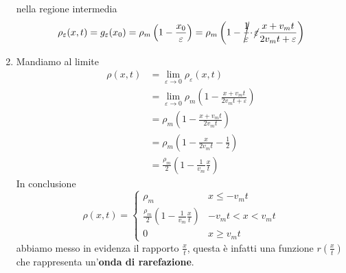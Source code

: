 \documentclass[10pt,a4paper,twoside,openright]{book}
\begin{document}
\begin{enumerate}

          nella regione intermedia
          \begin{equation*}
              \rho _{\varepsilon }(x,t) =g_{\varepsilon }(x_{0}) =\rho _{m}\left(1-\frac{x_{0}}{\varepsilon }\right) =\rho _{m}\left(1-\cancel{\frac{1}{\varepsilon }} \cdotp \cancel{\varepsilon }\frac{x+v_{m} t}{2v_{m} t+\varepsilon }\right)
          \end{equation*}
    \item Mandiamo al limite
          \begin{align*}
              \rho (x,t) & =\lim _{\varepsilon \rightarrow 0} \rho _{\varepsilon }(x,t)                                       \\
                         & =\lim _{\varepsilon \rightarrow 0} \rho _{m}\left(1-\frac{x+v_{m} t}{2v_{m} t+\varepsilon }\right) \\
                         & =\rho _{m}\left(1-\frac{x+v_{m} t}{2v_{m} t}\right)                                                \\
                         & =\rho _{m}\left(1-\frac{x}{2v_{m} t} -\frac{1}{2}\right)                                           \\
                         & =\frac{\rho _{m}}{2}\left(1-\frac{1}{v_{m}}\frac{x}{t}\right)
          \end{align*}
          In conclusione
          \begin{equation*}
              \rho (x,t) = \begin{cases}
                  \rho _{m}                                                     & x\le -v_{m}t         \\
                  \frac{\rho _{m}}{2}\left(1-\frac{1}{v_{m}}\frac{x}{t} \right) & -v_{m}t < x < v_{m}t \\
                  0                                                             & x\geq v_{m}t
              \end{cases}
          \end{equation*}
          abbiamo messo in evidenza il rapporto $\frac{x}{t}$, questa è infatti una funzione $r\left(\frac{x}{t}\right)$ che rappresenta un'\textbf{onda di rarefazione}.
\end{enumerate}

\end{document}

